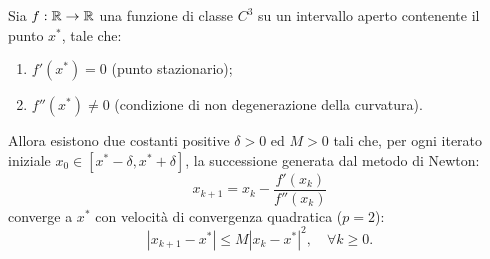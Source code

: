 \begin{theorem}
\label{thm:newton-quadratic-convergence-proof}
Sia $f: \mathbb{R} \to \mathbb{R}$ una funzione di classe $C^3$ su un intervallo aperto contenente il punto $x^*$, tale che:
\begin{enumerate}
    \item $f'(x^*) = 0$ (punto stazionario);
    \item $f''(x^*) \ne 0$ (condizione di non degenerazione della curvatura).
\end{enumerate}
Allora esistono due costanti positive $\delta > 0$ ed $M > 0$ tali che, per ogni iterato iniziale $x_0 \in [x^* - \delta, x^* + \delta]$, la successione generata dal metodo di Newton:
\begin{equation}
    x_{k+1} = x_k - \frac{f'(x_k)}{f''(x_k)}
\end{equation}
converge a $x^*$ con velocit\`a di convergenza quadratica ($p = 2$):
\begin{equation}
    |x_{k+1} - x^*| \le M |x_k - x^*|^2, \quad \forall k \ge 0.
    \label{eq:newton-quadratic-bound}
\end{equation}
\end{theorem}

